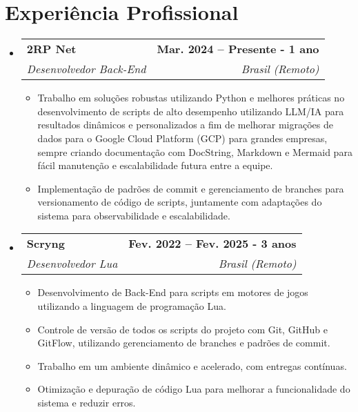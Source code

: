 \documentclass[letterpaper,11pt]{article}
\makeatletter
\newcommand{\resumeItem}[1]{
  \item\small{
    {#1 \vspace{-2pt}}
  }
}
\newcommand{\resumeSubheading}[4]{
  \vspace{-2pt}\item
    \begin{tabular*}{1.0\textwidth}[t]{l@{\extracolsep{\fill}}r}
      \textbf{#1} & \textbf{\small #2} \\
      \textit{\small#3} & \textit{\small #4} \\
    \end{tabular*}\vspace{-7pt}
}
\newcommand{\resumeSubHeadingListStart}{\begin{itemize}[leftmargin=0.0in, label={}]}
\newcommand{\resumeSubHeadingListEnd}{\end{itemize}}
\newcommand{\resumeItemListStart}{\begin{itemize}}
\newcommand{\resumeItemListEnd}{\end{itemize}\vspace{-5pt}}
\makeatother
\begin{document}
\section{Experiência Profissional}
  \resumeSubHeadingListStart

    \resumeSubheading
      {2RP Net}{Mar. 2024 -- Presente - 1 ano}
      {Desenvolvedor Back-End}{Brasil (Remoto)}
      \resumeItemListStart
        \resumeItem{Trabalho em soluções robustas utilizando Python e melhores práticas no desenvolvimento de scripts de alto desempenho utilizando LLM/IA para resultados dinâmicos e personalizados a fim de melhorar migrações de dados para o Google Cloud Platform (GCP) para grandes empresas, sempre criando documentação com DocString, Markdown e Mermaid para fácil manutenção e escalabilidade futura entre a equipe.}
        \resumeItem{Implementação de padrões de commit e gerenciamento de branches para versionamento de código de scripts, juntamente com adaptações do sistema para observabilidade e escalabilidade.}
      \resumeItemListEnd
      
    \resumeSubheading
      {Scryng}{Fev. 2022 -- Fev. 2025 - 3 anos}
      {Desenvolvedor Lua}{Brasil (Remoto)}
      \resumeItemListStart
        \resumeItem{Desenvolvimento de Back-End para scripts em motores de jogos utilizando a linguagem de programação Lua.}
        \resumeItem{Controle de versão de todos os scripts do projeto com Git, GitHub e GitFlow, utilizando gerenciamento de branches e padrões de commit.}
        \resumeItem{Trabalho em um ambiente dinâmico e acelerado, com entregas contínuas.}
        \resumeItem{Otimização e depuração de código Lua para melhorar a funcionalidade do sistema e reduzir erros.}
      \resumeItemListEnd

  \resumeSubHeadingListEnd
\vspace{-16pt}

\end{document}
